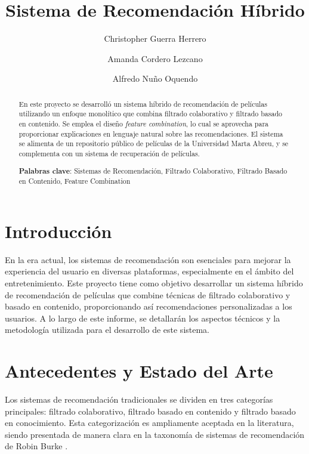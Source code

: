 \documentclass{llncs}
\begin{document}
	
	\title{Sistema de Recomendación Híbrido}
	\author{Christopher Guerra Herrero \and Amanda Cordero Lezcano \and Alfredo Nuño Oquendo}
	
	\maketitle
	
	\begin{abstract}
		En este proyecto se desarrolló un sistema híbrido de recomendación de películas utilizando un enfoque monolítico que combina filtrado colaborativo y filtrado basado en contenido. Se emplea el diseño \textit{feature combination}, lo cual se aprovecha para proporcionar explicaciones en lenguaje natural sobre las recomendaciones. El sistema se alimenta de un repositorio público de películas de la Universidad Marta Abreu, y se complementa con un sistema de recuperación de películas.
		
		\textbf{Palabras clave}: Sistemas de Recomendación, Filtrado Colaborativo, Filtrado Basado en Contenido, Feature Combination
	\end{abstract}
	
	\section{Introducción}
	En la era actual, los sistemas de recomendación son esenciales para mejorar la experiencia del usuario en diversas plataformas, especialmente en el ámbito del entretenimiento. Este proyecto tiene como objetivo desarrollar un sistema híbrido de recomendación de películas que combine técnicas de filtrado colaborativo y basado en contenido, proporcionando así recomendaciones personalizadas a los usuarios. A lo largo de este informe, se detallarán los aspectos técnicos y la metodología utilizada para el desarrollo de este sistema.
	\section{Antecedentes y Estado del Arte}
	Los sistemas de recomendación tradicionales se dividen en tres categorías principales: filtrado colaborativo, filtrado basado en contenido y filtrado basado en conocimiento. Esta categorización es ampliamente aceptada en la literatura, siendo presentada de manera clara en la taxonomía de sistemas de recomendación de Robin Burke \cite{burke2002hybrid}.
	
\end{document}
